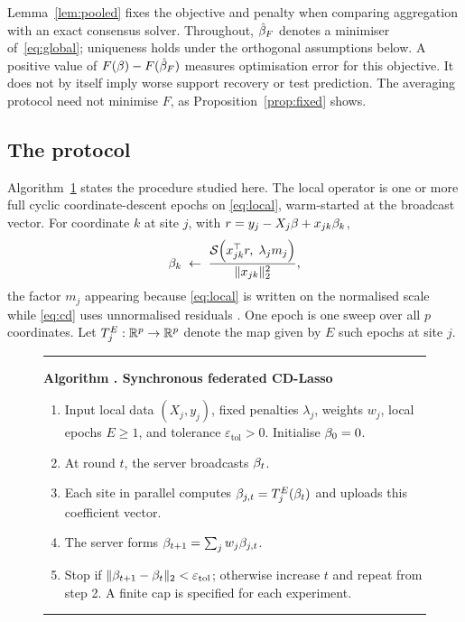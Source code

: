 Lemma~\ref{lem:pooled} fixes the objective and penalty when comparing
aggregation with an exact consensus solver. Throughout, $\hat{\beta}_F$
denotes a minimiser of~\eqref{eq:global}; uniqueness holds under the
orthogonal assumptions below. A positive value of
$F(\beta)-F(\hat{\beta}_F)$ measures optimisation error for this objective.
It does not by itself imply worse support recovery or test prediction.
The averaging protocol need not minimise $F$, as
Proposition~\ref{prop:fixed} shows.

\subsection{The protocol}

Algorithm~\ref{alg:fedavg} states the procedure studied here. The local
operator is one or more full cyclic coordinate-descent epochs on
\eqref{eq:local}, warm-started at the broadcast vector. For coordinate $k$
at site $j$, with $r = y_j - X_j\beta + x_{jk}\beta_k$,
\begin{equation}
\beta_k \;\leftarrow\;
 \frac{\mathcal{S}\!\left(x_{jk}^\top r,\; \lambda_j m_j\right)}{\|x_{jk}\|_2^2},
\label{eq:cd}
\end{equation}
the factor $m_j$ appearing because \eqref{eq:local} is written on the
normalised scale while \eqref{eq:cd} uses unnormalised residuals
\citep{friedman2010}. One epoch is one sweep over all $p$ coordinates. Let
$T_j^E : \mathbb{R}^p \to \mathbb{R}^p$ denote the map given by $E$ such epochs at site $j$.

\begin{figure}[tb]
\centering
\begin{minipage}{0.98\linewidth}
\hrule\medskip
{}
\textbf{Algorithm \thealgorithm. Synchronous federated CD-Lasso}
\label{alg:fedavg}
\begin{enumerate}
\item Input local data $(X_j,y_j)$, fixed penalties $\lambda_j$, weights
$w_j$, local epochs $E\ge1$, and tolerance $\varepsilon_{\mathrm{tol}}>0$.
Initialise $\beta_0=0$.
\item At round $t$, the server broadcasts $\beta_t$.
\item Each site in parallel computes
$\beta_{j,t}=T_j^E(\beta_t)$ and uploads this coefficient vector.
\item The server forms $\beta_{t+1}=\sum_jw_j\beta_{j,t}$.
\item Stop if $\|\beta_{t+1}-\beta_t\|_2<\varepsilon_{\mathrm{tol}}$;
otherwise increase $t$ and repeat from step 2. A finite cap is specified
for each experiment.
\end{enumerate}
\hrule
\end{minipage}
\end{figure}

